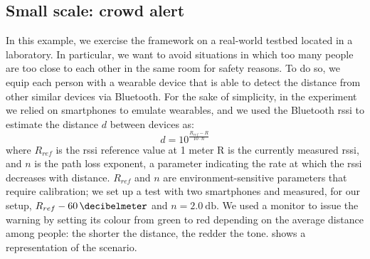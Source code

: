 \documentclass[conference]{IEEEtran}
\newcommand{\meta}[1]{{\color{blue}#1}}
\begin{document}
\subsection{Small scale: crowd alert}
\label{sec:small-scale-crowd-alert}

In this example, we exercise the framework on a real-world testbed
located in a laboratory.
%
In particular,
we want to avoid situations in which too many people are too close to each other in the same room for safety reasons.
%
To do so,
we equip each person with a wearable device that is able to detect the distance from other similar devices via Bluetooth.
%
For the sake of simplicity,
in the experiment we relied on smartphones to emulate wearables,
and we used
%
    the Bluetooth \ac{rssi} to estimate the distance $d$ between devices as:
    $$d=10^{\frac{R_{ref} - R}{10 \cdot n}}$$
    where $R_{ref}$ is the \ac{rssi} reference value at 1 meter
    R is the currently measured \ac{rssi},
    and $n$ is the path loss exponent,
    a parameter indicating the rate at which the \ac{rssi} decreases with distance.
    $R_{ref}$ and $n$ are environment-sensitive parameters that require calibration;
    we set up a test with two smartphones and measured,
    for our setup,
    $R_{ref}\qty{-60}{\decibelmeter}$ and $n=\qty{2.0}{\decibel}$.
%
We used a monitor to issue the warning
by setting its colour from green to red depending on the average distance among people:
the shorter the distance, the redder the tone.
%
 shows a representation of the scenario.
%
\end{document}
